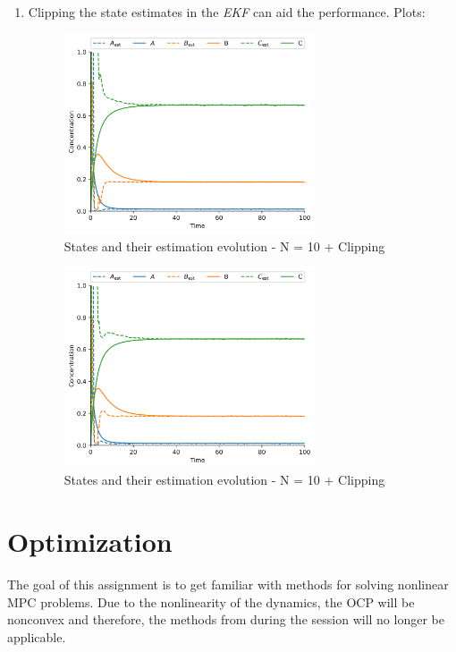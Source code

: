 \documentclass[]{article}
\begin{document}
\begin{enumerate}
	\item Clipping the state estimates in the \emph{EKF} can aid the performance. Plots:
	\begin{figure}[H]
		\centering
		\includegraphics[width=0.7\textwidth]{images/Assignment5_N=10_True.png}
		\caption{States and their estimation evolution - N = 10 + Clipping}
		\label{fig:assignment52_1}
	\end{figure}
	\begin{figure}[H]
		\centering
		\includegraphics[width=0.7\textwidth]{images/Assignment5_N=25_True.png}
		\caption{States and their estimation evolution - N = 10 + Clipping}
		\label{fig:assignment52_2}
	\end{figure}
\end{enumerate}




\newpage 
\section{Optimization}

The goal of this assignment is to get familiar with methods for solving nonlinear MPC problems. 
Due to the nonlinearity of the dynamics, the OCP
will be nonconvex and therefore, the methods from during the session will no longer be applicable. 
\end{document}
